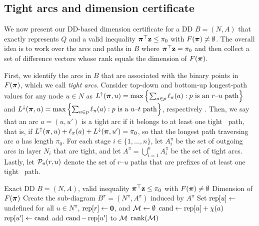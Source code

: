 \subsection{Tight arcs and dimension certificate}
\label{subsec:tight_arc_identification}

We now present our DD-based dimension certificate for a DD $B=(N,A)$ that exactly represents $Q$ and a valid inequality $\bm{\pi}^\top\mathbf{z} \leq \pi_0$ with $F(\bm{\pi}) \neq \emptyset$. The overall idea is to work over the arcs and paths in $B$ where $\bm{\pi}^\top\mathbf{z} = \pi_0$ and then collect a set of difference vectors whose rank equals the dimension of $F(\bm{\pi})$.

First, we identify the arcs in $B$ that are associated with the binary points in $F(\bm{\pi})$, which we call \emph{tight arcs}. Consider top-down and bottom-up longest-path values for any node $u \in N$ as $ L^\uparrow(\bm{\pi},u) =\max\left\{\sum_{a\in p}\ell_\pi(a): p \text{ is an } r\text{--}u \text{ path}\right\}$ and $ L^\downarrow(\bm{\pi},u)= \max\left\{\sum_{a\in p}\ell_\pi(a): p \text{ is a } u\text{--}t \text{ path}\right\} $, respectively \cite{tjandraatmadjaVanHoeve2019target,castroCireBeck2022cutLift}. 
Then, we say that an arc $a=(u,u')$ is a tight arc if it belongs to at least one tight \rt\ path, that is, if $L^\uparrow(\bm{\pi},u)+\ell_\pi(a)+L^\downarrow(\bm{\pi},u')=\pi_0$, so that the longest path traversing arc $a$ has length $\pi_0$. For each stage $i\in\{1,\ldots,n\}$, let $A^\pi_i$ be the set of outgoing arcs in layer $N_i$ that are tight, and let $A^\pi=\bigcup_{i =1}^n A^\pi_i$ be the set of tight arcs. Lastly, let $\mathcal{P}_\pi(r,u)$ denote the set of $r$--$u$ paths that are prefixes of at least one tight \rt\ path.

\begin{algorithm}[t]
\caption{\textsc{DD-DimensionCertificate}}
\label{alg:dd_dimension_audit}
\begin{algorithmic}[1]
\Require Exact DD $B=(N,A)$, valid inequality $\bm{\pi}^\top \mathbf{z}\le \pi_0$ with $F(\bm{\pi})\neq \emptyset$ 
\Ensure Dimension of  $F(\bm{\pi})$
\State Create the sub-diagram $B^\pi= (N^\pi, A^\pi)$ induced by $A^\pi$ \label{line:dim:create_dd}
\State Set $\operatorname{rep}[u]\gets$ undefined for all $u\in N^\pi$,  $\operatorname{rep}[r]\gets \mathbf{0}$, and $\mathcal{M}\gets\emptyset$
        \State $\operatorname{cand}\gets \operatorname{rep}[u]+\chi(a)$\label{line:dim:create_candidate}
            \State $\operatorname{rep}[u']\gets \operatorname{cand}$ \label{line:dim:set_candidate}
        \Else
            \State add $\operatorname{cand}-\operatorname{rep}[u']$ to $\mathcal{M}$ \label{line:dim:add_to_M}
        \EndIf
    \EndFor
\EndFor
\State \Return $\operatorname{rank}(\mathcal{M})$
\end{algorithmic}
\end{algorithm}

